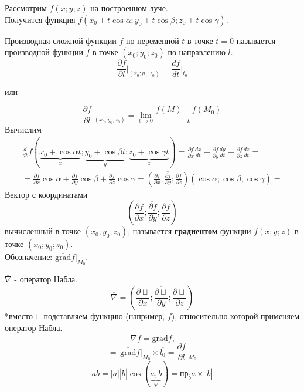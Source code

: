 \documentclass[12pt]{article}
\begin{document}
    Рассмотрим $f(x;y;z)$ на построенном луче.\\
    Получится функция $f(x_0 + t\cos \alpha; y_0 + t \cos \beta; z_0 + t \cos \gamma)$.\par\noindent
    Производная сложной функции $f$ по переменной $t$ в точке $t = 0$ называется производной функции $f$ в точке $(x_0; y_0; z_0)$ по направлению $l$.
    \[ \frac{\partial f}{\partial l} \Big|_{(x_0; y_0; z_0)} = \frac{df}{dt}\Big|_{t_0} \]
    \begin{center}
        или
        \end{center}
    \[ \frac{\partial f}{\partial l} \Big|_{(x_0; y_0; z_0)} = \lim_{t \to 0}\frac{f(M) - f(M_0)}{t} \]
    Вычислим
    \begin{gather*}
        \frac{d}{dt}f(\underbrace{x_0 + \cos \alpha t}_x; \underbrace{y_0 + \cos \beta t}_y; \underbrace{z_0 + \cos \gamma t}_z) = \frac{\partial f}{\partial x} \frac{dx}{dt} + \frac{\partial f}{\partial y} \frac{dy}{dt} + \frac{\partial f}{\partial z} \frac{dz}{dt} =\\
        = \frac{\partial f}{\partial x} \cos \alpha + \frac{\partial f}{\partial y} \cos \beta + \frac{\partial f}{\partial z} \cos \gamma = \left( \overline{\frac{\partial f}{\partial x}; \frac{\partial f}{\partial y}; \frac{\partial f}{\partial z}} \right)\left( \overline{\cos \alpha; \cos \beta; \cos \gamma} \right) \boxed{=}
    \end{gather*}
    Вектор с координатами 
    \[ \left( \overline{\frac{\partial f}{\partial x}; \frac{\partial f}{\partial y}; \frac{\partial f}{\partial z}} \right) \]
    вычисленный в точке $(x_0; y_0; z_0)$, называется \textbf{градиентом} функции $f(x; y; z)$ в точке $(x_0; y_0; z_0)$.\\
    Обозначение: $\overline{\text{grad}}f \Big|_{M_0}$.\par\noindent
    $\overline{\nabla}$ - оператор Набла.
    \[ \overline{\nabla} = \left( \overline{ \frac{\partial \sqcup}{\partial x}; \frac{\partial \sqcup}{\partial y}; \frac{\partial \sqcup}{\partial z} } \right) \]
    *вместо $\sqcup$ подставляем функцию (например, $f$), относительно которой применяем оператор Набла.
    \[ \overline{\nabla} f = \overline{\text{grad}}f\text{,} \]
    \[ \boxed{=} \, \boxed{ \overline{\text{grad}}f\Big|_{M_0} \times \overline{l_0} = \frac{\partial f}{\partial l}\Big|_{M_0} } \]
    \[ \overline{a}\overline{b} = |\overline{a}||\overline{b}|\cos(\underbrace{\overline{a}, \overline{b}}_{\varphi}) = \text{пр}_{\overline{b}} \overline{a} \times |\overline{b}| \]
\end{document}
